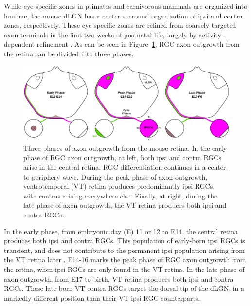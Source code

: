 While eye-specific zones in primates and carnivorous mammals are organized into laminae, the mouse dLGN has a center-surround organization of ipsi and contra zones, respectively.
These eye-specific zones are refined from coarsely targeted axon terminals in the first two weeks of postnatal life, largely by activity-dependent refinement \cite{huberman2008mechanisms,feldheim2010visual}.
As can be seen in Figure~\ref{figures/RGP_DevSeries}, RGC axon outgrowth from the retina can be divided into three phases.
\begin{figure}[hbtp]
	\begin{center}
		\includegraphics[width=\textwidth]{figures/RGP_DevSeries.svg}
		\caption{Three phases of axon outgrowth from the mouse retina. In the early phase of RGC axon outgrowth, at left, both ipsi and contra RGCs arise in the central retina. RGC differentiation continues in a center-to-periphery wave. During the peak phase of axon outgrowth, ventrotemporal (VT) retina produces predominantly ipsi RGCs, with contras arising everywhere else. Finally, at right, during the late phase of axon outgrowth, the VT retina produces both ipsi and contra RGCs.}
		\label{figures/RGP_DevSeries}
	\end{center}
\end{figure}
In the early phase, from embryonic day (E) 11 or 12 to E14, the central retina produces both ipsi and contra RGCs.
This population of early-born ipsi RGCs is transient, and does not contribute to the permanent ipsi population arising from the VT retina later \cite{drager1985birth,colello1990early,soares2015transient}.
E14-16 marks the peak phase of RGC axon outgrowth from the retina, when ipsi RGCs are only found in the VT retina.
In the late phase of axon outgrowth, from E17 to birth, VT retina produces both ipsi and contra RGCs.
These late-born VT contra RGCs target the dorsal tip of the dLGN, in a markedly different position than their VT ipsi RGC counterparts.


